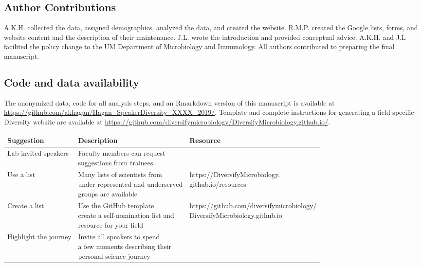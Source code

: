 \documentclass[10pt,]{article}
\begin{document}
\subsection{Author Contributions}\label{author-contributions}

A.K.H. collected the data, assigned demographics, analyzed the data, and
created the website. R.M.P. created the Google lists, forms, and website
content and the description of their maintenance. J.L. wrote the
introduction and provided conceptual advice. A.K.H. and J.L facilited
the policy change to the UM Department of Microbiology and Immunology.
All authors contributed to preparing the final manuscript.

\subsection{Code and data
availability}\label{code-and-data-availability}

The anonymized data, code for all analysis steps, and an Rmarkdown
version of this manuscript is available at
\url{https://github.com/akhagan/Hagan_SpeakerDiversity_XXXX_2019/}.
Template and complete instructions for generating a field-specific
Diversity website are available at
\url{https://github.com/diversifymicrobiology/DiversifyMicrobiology.github.io/}.

\newpage

\begin{center}
\small
\begin{tabular}{|l|l|l|}
\hline

\rowcolor{lightgray}
\textbf{Suggestion} & \textbf{Description} & \textbf{Resource} \\ \hline

Lab-invited speakers & \makecell[l]{Faculty members can request \\suggestions from trainees} & \\ \hline

Use a list & \makecell[l]{Many lists of scientists from \\under-represented and underserved \\groups are available} &  \makecell[l]{https://DiversifyMicrobiology.\\github.io/resources}\\ \hline

Create a list & \makecell[l]{Use the GitHub template \\ create a self-nomination list and \\resource for your field} & \makecell[l]{https://github.com/diversifymicrobiology/\\DiversifyMicrobiology.github.io} \\ \hline

Highlight the journey & \makecell[l]{Invite all speakers to spend \\a few moments describing their \\personal science journey} & \\ \hline

\end{tabular}
\end{center}
\end{document}
